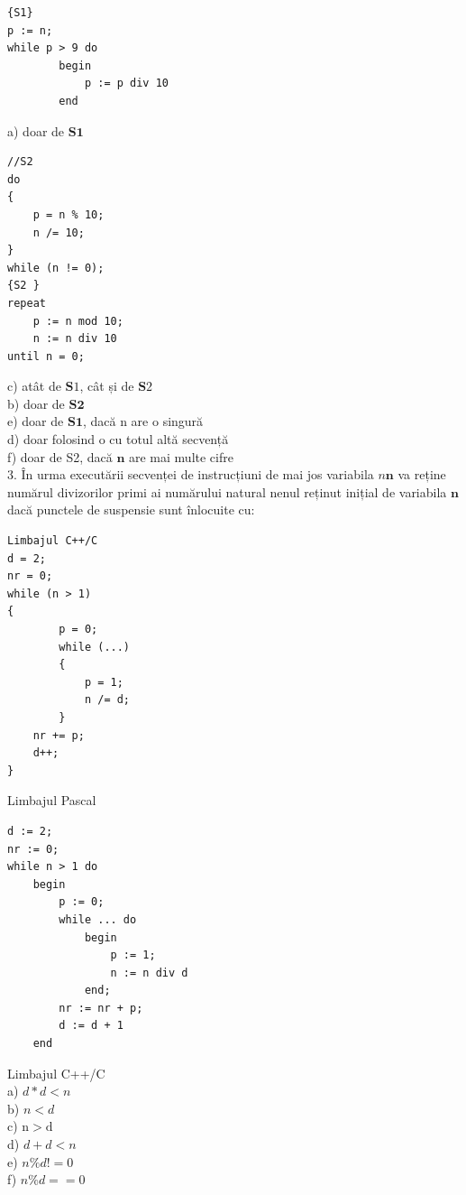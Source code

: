 \documentclass[10pt]{article}
\begin{document}
\begin{verbatim}
{S1}
p := n;
while p > 9 do
        begin
            p := p div 10
        end
\end{verbatim}

a) doar de $\mathbf{S 1}$

\begin{verbatim}
//S2
do
{
    p = n % 10;
    n /= 10;
}
while (n != 0);
{S2 }
repeat
    p := n mod 10;
    n := n div 10
until n = 0;
\end{verbatim}

c) atât de $\mathbf{S} 1$, cât și de $\mathbf{S} 2$\\
b) doar de $\mathbf{S 2}$\\
e) doar de $\mathbf{S 1}$, dacă n are o singură\\
d) doar folosind o cu totul altă secvență\\
f) doar de S2, dacă $\mathbf{n}$ are mai multe cifre\\
3. În urma executării secvenței de instrucțiuni de mai jos variabila $n \boldsymbol{n}$ va reține numărul divizorilor primi ai numărului natural nenul reținut inițial de variabila $\mathbf{n}$ dacă punctele de suspensie sunt înlocuite cu:

\begin{verbatim}
Limbajul C++/C
d = 2;
nr = 0;
while (n > 1)
{
        p = 0;
        while (...)
        {
            p = 1;
            n /= d;
        }
    nr += p;
    d++;
}
\end{verbatim}

Limbajul Pascal

\begin{verbatim}
d := 2;
nr := 0;
while n > 1 do
    begin
        p := 0;
        while ... do
            begin
                p := 1;
                n := n div d
            end;
        nr := nr + p;
        d := d + 1
    end
\end{verbatim}

Limbajul C++/C\\
a) $d * d<n$\\
b) $n<d$\\
c) $\mathrm{n}>\mathrm{d}$\\
d) $d+d<n$\\
e) $n \% d!=0$\\
f) $n \% d==0$
\end{document}
